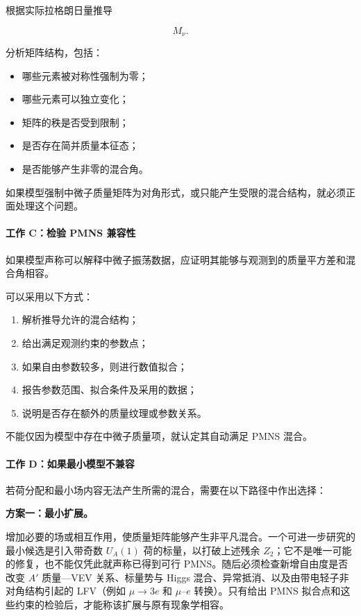 \documentclass[
  chinese,
  UTF8]{ctexart}
\providecommand{\tightlist}{%
  \setlength{\itemsep}{0pt}\setlength{\parskip}{0pt}}
\begin{document}
根据实际拉格朗日量推导

\[
M_\nu.
\]

分析矩阵结构，包括：

\begin{itemize}
\tightlist
\item
  哪些元素被对称性强制为零；
\item
  哪些元素可以独立变化；
\item
  矩阵的秩是否受到限制；
\item
  是否存在简并质量本征态；
\item
  是否能够产生非零的混合角。
\end{itemize}

如果模型强制中微子质量矩阵为对角形式，或只能产生受限的混合结构，就必须正面处理这个问题。

\paragraph{工作 C：检验 PMNS
兼容性}\label{ux5de5ux4f5c-cux68c0ux9a8c-pmns-ux517cux5bb9ux6027}

如果模型声称可以解释中微子振荡数据，应证明其能够与观测到的质量平方差和混合角相容。

可以采用以下方式：

\begin{enumerate}
\def\labelenumi{\arabic{enumi}.}
\tightlist
\item
  解析推导允许的混合结构；
\item
  给出满足观测约束的参数点；
\item
  如果自由参数较多，则进行数值拟合；
\item
  报告参数范围、拟合条件及采用的数据；
\item
  说明是否存在额外的质量纹理或参数关系。
\end{enumerate}

不能仅因为模型中存在中微子质量项，就认定其自动满足 PMNS 混合。

\paragraph{工作
D：如果最小模型不兼容}\label{ux5de5ux4f5c-dux5982ux679cux6700ux5c0fux6a21ux578bux4e0dux517cux5bb9}

若荷分配和最小场内容无法产生所需的混合，需要在以下路径中作出选择：

\textbf{方案一：最小扩展。}

增加必要的场或相互作用，使质量矩阵能够产生非平凡混合。一个可进一步研究的最小候选是引入带奇数
\(U_A(1)\) 荷的标量，以打破上述残余
\(Z_2\)；它不是唯一可能的修复，也不能仅凭此就声称已得到可行
PMNS。随后必须检查新增自由度是否改变 \(A'\) 质量---VEV 关系、标量势与
Higgs 混合、异常抵消、以及由带电轻子非对角结构引起的 LFV（例如
\(\mu\to3e\) 和 \(\mu\)--\(e\) 转换）。只有给出 PMNS
拟合点和这些约束的检验后，才能称该扩展与原有现象学相容。
\end{document}
